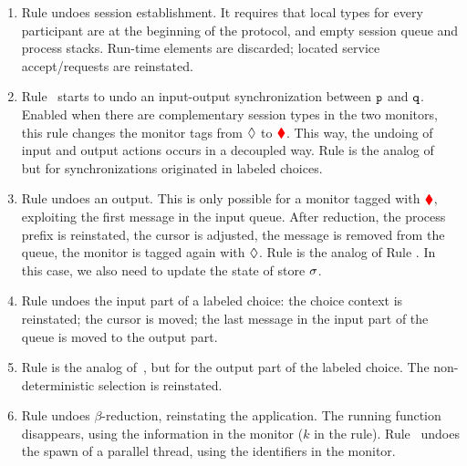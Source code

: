 \documentclass[runningheads]{llncs}
\newcommand{\erase}[1]{#1}
\begin{document}
\begin{enumerate}[$\bkcolor{\blacktriangleleft}$]
\item Rule  undoes session establishment. It requires that local types for every participant are at the beginning of the protocol, and empty session queue and process stacks. Run-time elements are discarded; located service accept/requests are reinstated.

\item Rule~ starts to undo an input-output synchronization between $\mathtt{p}$ and $\mathtt{q}$. 
Enabled when there are complementary session types in the two monitors, this rule changes the monitor tags  from $\lozenge$ to $\textcolor{red}{\blacklozenge}$. %
This way, the undoing of input and output actions occurs in a decoupled way. 
Rule  is the analog of~ but for synchronizations originated in labeled choices.

\item Rule  undoes an output. This is only possible for a  monitor tagged with $\textcolor{red}{\blacklozenge}$, exploiting the first message in the input queue. After reduction, the process prefix is reinstated, the cursor is adjusted, the message is removed from the queue, 
the   monitor is tagged again with $\lozenge$.
Rule  is the analog of Rule . In this case, we also need to update the state of store $\sigma$. 

\item 
\erase{Rule  undoes the input part of a labeled choice: the choice context is reinstated; the cursor is moved; the last message in the input part of the queue is moved to the output part. 
\item 
Rule \bkcolor{\textsc{(RSel)}} is the analog of~\bkcolor{\textsc{(RBra)}}, but for the output part of the labeled choice. The non-deterministic   selection is reinstated.}

\item Rule  undoes $\beta$-reduction, reinstating the application. The running function disappears, using the information in the 
  monitor ($k$ in the rule).
Rule~ undoes the spawn of a parallel thread, using the identifiers in the  monitor. 
\end{enumerate}
\end{document}

